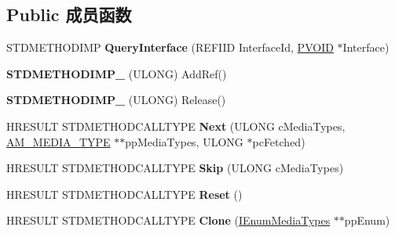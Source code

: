 \subsection*{Public 成员函数}
\begin{DoxyCompactItemize}
\item 
\mbox{\label{class_c_enum_media_types_a2d2f0e2419e7bf6450ac2051030c71d9}} 
S\+T\+D\+M\+E\+T\+H\+O\+D\+I\+MP {\bfseries Query\+Interface} (R\+E\+F\+I\+ID Interface\+Id, \hyperlink{interfacevoid}{P\+V\+O\+ID} $\ast$Interface)
\item 
\mbox{\label{class_c_enum_media_types_af0f88e544323168a44c5067a4148697f}} 
{\bfseries S\+T\+D\+M\+E\+T\+H\+O\+D\+I\+M\+P\+\_\+} (U\+L\+O\+NG) Add\+Ref()
\item 
\mbox{\label{class_c_enum_media_types_a214edb37be309bc87a48223847bb4bfb}} 
{\bfseries S\+T\+D\+M\+E\+T\+H\+O\+D\+I\+M\+P\+\_\+} (U\+L\+O\+NG) Release()
\item 
\mbox{\label{class_c_enum_media_types_a0ce2ac1725e2f768b5fdddefbada523b}} 
H\+R\+E\+S\+U\+LT S\+T\+D\+M\+E\+T\+H\+O\+D\+C\+A\+L\+L\+T\+Y\+PE {\bfseries Next} (U\+L\+O\+NG c\+Media\+Types, \hyperlink{struct_a_m___m_e_d_i_a___t_y_p_e}{A\+M\+\_\+\+M\+E\+D\+I\+A\+\_\+\+T\+Y\+PE} $\ast$$\ast$pp\+Media\+Types, U\+L\+O\+NG $\ast$pc\+Fetched)
\item 
\mbox{\label{class_c_enum_media_types_a0848341e563110af55130655ad4ddde2}} 
H\+R\+E\+S\+U\+LT S\+T\+D\+M\+E\+T\+H\+O\+D\+C\+A\+L\+L\+T\+Y\+PE {\bfseries Skip} (U\+L\+O\+NG c\+Media\+Types)
\item 
\mbox{\label{class_c_enum_media_types_a4f23fa609e66a6061f97226a824c7090}} 
H\+R\+E\+S\+U\+LT S\+T\+D\+M\+E\+T\+H\+O\+D\+C\+A\+L\+L\+T\+Y\+PE {\bfseries Reset} ()
\item 
\mbox{\label{class_c_enum_media_types_a19a6dde16432acd6d05abf7156538233}} 
H\+R\+E\+S\+U\+LT S\+T\+D\+M\+E\+T\+H\+O\+D\+C\+A\+L\+L\+T\+Y\+PE {\bfseries Clone} (\hyperlink{interface_i_enum_media_types}{I\+Enum\+Media\+Types} $\ast$$\ast$pp\+Enum)
\item 
\mbox{\label{class_c_enum_media_types_a845104868b04e49f9bba9a328288cf82}} 

\end{DoxyCompactItemize}
